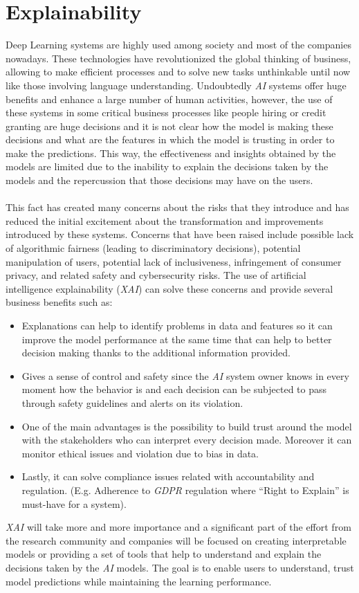 \section{Explainability}
\label{sec:Explainability}
\noindent Deep Learning systems are highly used among society and most of the companies nowadays. These technologies have revolutionized the global thinking of business, allowing to make efficient processes and to solve new tasks unthinkable until now like those involving language understanding. Undoubtedly \emph{AI} systems offer huge benefits and enhance a large number of human activities, however, the use of these systems in some critical business processes like people hiring or credit granting are huge decisions and it is not clear how the model is making these decisions and what are the features in which the model is trusting in order to make the predictions. This way, the effectiveness and insights obtained by the models are limited due to the inability to explain the decisions taken by the models and the repercussion that those decisions may have on the users.
\paragraph{}
This fact has created many concerns about the risks that they introduce and has reduced the initial excitement about the transformation and improvements introduced by these systems. Concerns that have been raised include possible lack of algorithmic fairness (leading to discriminatory decisions), potential manipulation of users, potential lack of inclusiveness, infringement of consumer privacy, and related safety and cybersecurity risks. The use of artificial intelligence explainability (\emph{XAI}) can solve these concerns and provide several business benefits such as:
\begin{itemize}
\item Explanations can help to identify problems in data and features so it can improve the model performance at the same time that can help to better decision making thanks to the additional information provided.
\item Gives a sense of control and safety since the \emph{AI} system owner knows in every moment how the behavior is and each decision can be subjected to pass through safety guidelines and alerts on its violation.
\item One of the main advantages is the possibility to build trust around the model with the stakeholders who can interpret every decision made. Moreover it can monitor ethical issues and violation due to bias in data.
\item Lastly, it can solve compliance issues related with accountability and regulation. (E.g. Adherence to \emph{GDPR} regulation where ``Right to Explain'' is must-have for a system).
\end{itemize}
\emph{XAI} will take more and more importance and a significant part of the effort from the research community and companies will be focused on creating interpretable models or providing a set of tools that help to understand and explain the decisions taken by the \emph{AI} models. The goal is to enable users to understand, trust model predictions while maintaining the learning performance.
